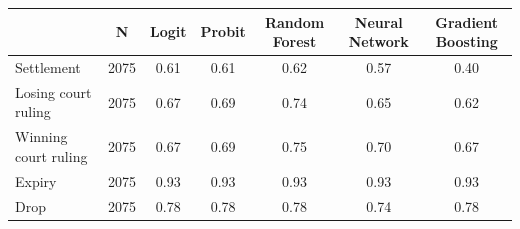 \begin{tabular}{lcccccc}
\toprule
                     & N    & Logit & Probit & Random Forest & Neural Network & Gradient Boosting \\
\midrule
\midrule
Settlement           & 2075 & \cellcolor[rgb]{ .929,  .929,  .929} 0.61  & 0.61   & 0.62        & 0.57           & 0.40              \\
Losing court ruling  & 2075 & 0.67  & 0.69   & \cellcolor[rgb]{ .929,  .929,  .929} 0.74          & 0.65           & 0.62              \\
Winning court ruling & 2075 & 0.67  & 0.69   & \cellcolor[rgb]{ .929,  .929,  .929} 0.75         & 0.70           & 0.67              \\
Expiry               & 2075 & \cellcolor[rgb]{ .929,  .929,  .929} 0.93  & 0.93   & 0.93          & 0.93           & 0.93              \\
Drop                 & 2075 & \cellcolor[rgb]{ .929,  .929,  .929} 0.78  & 0.78   & 0.78          & 0.74           & 0.78             \\
\bottomrule
\end{tabular}